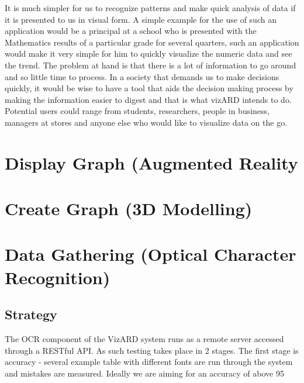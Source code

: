 \documentclass[a4paper,12pt]{article}
\begin{document}
It is much simpler for us to recognize patterns and make quick analysis of data if it is presented to us in visual form. A simple example for the use of such an application would be a principal at a school who is presented with the Mathematics results of a particular grade for several quarters, such an application would make it very simple for him to quickly visualize the numeric data and see the trend.
\newline
\newline
The problem at hand is that there is a lot of information to go around and so little time to process. In a society that demands us to make decisions quickly, it would be wise to have a tool that aids the decision making process by making the information easier to digest and that is what vizARD intends to do.
\newline
\newline
Potential users could range from students, researchers, people in business, managers at stores and anyone else who would like to visualize data on the go.
		
\newpage
\section{Display Graph (Augmented Reality}

\section{Create Graph (3D Modelling)}

\section{Data Gathering (Optical Character Recognition)}
	\subsection{Strategy} The OCR component of the VizARD system runs as a remote server accessed through a RESTful API. As such testing takes place in 2 stages. The first stage is accuracy - several example table with different fonts are run through the system and mistakes are measured. Ideally we are aiming for an accuracy of above 95%
	
\end{document}
